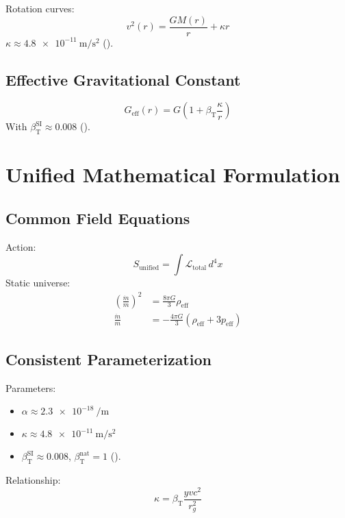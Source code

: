\documentclass[a4paper,12pt]{article}
\theoremstyle{definition}
\theoremstyle{remark}
\newcommand{\betaT}{\beta_{\text{T}}}
\begin{document}
	Rotation curves:
	\begin{equation}
		v^2(r) = \frac{G M(r)}{r} + \kappa r
	\end{equation}
	\(\kappa \approx \SI{4.8e-11}{\meter\per\second\squared}\) (\cite{pascher_galaxies_2025}).
	
	\subsection{Effective Gravitational Constant}
	
	\begin{equation}
		G_{\text{eff}}(r) = G \left(1 + \betaT \frac{\kappa}{r}\right)
	\end{equation}
	With \(\betaT^{\text{SI}} \approx 0.008\) (\cite{pascher_params_2025}).
	
	\section{Unified Mathematical Formulation}
	
	\subsection{Common Field Equations}
	
	Action:
	\begin{equation}
		S_\text{unified} = \int \mathcal{L}_\text{total} \, d^4x
	\end{equation}
	Static universe:
	\begin{align}
		\left(\frac{\dot{m}}{m}\right)^2 &= \frac{8\pi G}{3} \rho_{\text{eff}} \\
		\frac{\ddot{m}}{m} &= -\frac{4\pi G}{3} (\rho_{\text{eff}} + 3p_{\text{eff}})
	\end{align}
	
	\subsection{Consistent Parameterization}
	
	Parameters:
	\begin{itemize}
		\item \(\alpha \approx \SI{2.3e-18}{\per\meter}\)
		\item \(\kappa \approx \SI{4.8e-11}{\meter\per\second\squared}\)
		\item \(\betaT^{\text{SI}} \approx 0.008\), \(\betaT^{\text{nat}} = 1\) (\cite{pascher_params_2025}).
	\end{itemize}
	Relationship:
	\begin{equation}
		\kappa = \betaT \frac{y v c^2}{r_g^2}
	\end{equation}
	
\end{document}
